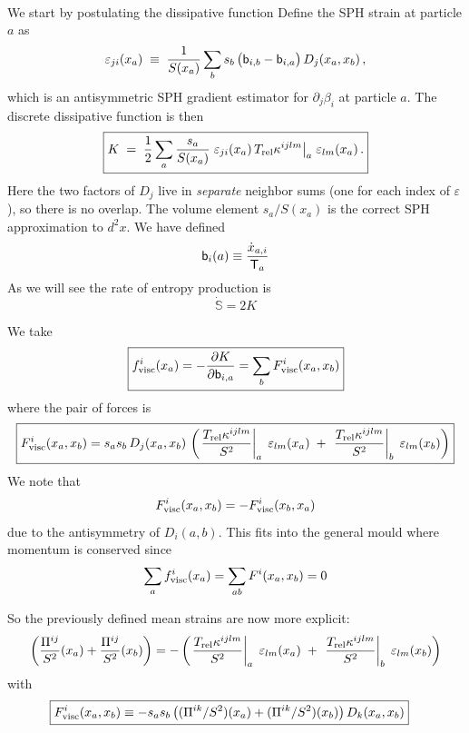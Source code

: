 \documentclass[12pt,aps,preprint,nofootinbib,noshowkeys,noshowpacs,longbibliography,superscriptaddress,tightenlines]{revtex4-2}
\def\Sbb{{\mathbb S}}
\def\bbeta{{\sf b}}
\def\Teff{{\sf T}}
\def\st{\begin{equation}}
\def\stp{\end{equation}}
\begin{document}
 
 \\

We start by postulating the dissipative function
Define the SPH strain at particle $a$ as
\begin{equation}
\label{eq:strain}
    \varepsilon_{ji}(x_a) \;\equiv\;
    \frac{1}{S(x_a)}\sum_b s_b\,
    \bigl(\bbeta_{i,b} - \bbeta_{i,a}\bigr)\,D_j(x_a,x_b) \,,
\end{equation}
which is an antisymmetric SPH gradient estimator for $\partial_j\beta_i$ at
particle $a$.  The discrete dissipative function is then
\begin{equation}
\boxed{
\label{eq:K_twolevel}
    K \;=\; \frac{1}{2} \sum_a \frac{s_a}{S(x_a)}\;
    \varepsilon_{ji}(x_a)\,
    T_{\rm rel}\kappa^{ijlm}\big|_a\;
    \varepsilon_{lm}(x_a) \,.
}
\end{equation}
Here the two factors of $D_j$ live in \emph{separate} neighbor sums (one for
each index of $\varepsilon$), so there is no overlap.  The volume element
$s_a/S(x_a)$ is the correct SPH approximation to $d^2x$.
We have defined
\st
\bbeta_i(a) \equiv \frac{\dot x_{a, i} }{\Teff_a}
\stp
As we will see the rate of entropy production is 
\st
 \dot \Sbb = 2 K 
\stp

We take 
\st
\boxed{
f_{\rm visc}^i(x_a)  = -\frac{\partial K}{\partial \bbeta_{i, a }  } = \sum_b F^i_{\rm visc}(x_a, x_b) }
\stp
where the pair of forces is
\st
\boxed{
      F^i_{\rm visc}(x_a, x_b) = s_a s_b \,D_j(x_a, x_b)\,
     \left( \left. \frac{T_{\rm rel}\kappa^{ijlm}}{S^2}\right|_a\;\varepsilon_{lm}(x_a)
    \;+\;
    \left. \frac{T_{\rm rel}\kappa^{ijlm}}{S^2}\right|_b\;\varepsilon_{lm}(x_b) \right)
}
\stp
We note that
\st
 F^i_{\rm visc}(x_a, x_b) = - F^i_{\rm visc}(x_b, x_a)
\stp
due to the antisymmetry of $D_i(a,b)$. 
This fits into the general mould where momentum is conserved since
\st
\sum_{a} f_{\rm visc}^i(x_a) =\sum_{ab} F^i(x_a, x_b)= 0 
\stp

So the previously defined mean strains are now more explicit:
\st
   \left(\frac{\Pi^{ij}}{S^2}(x_a)  
   +
   \frac{\Pi^{ij}}{S^2}(x_b)  
   \right)
     =
     -\left( \left. \frac{T_{\rm rel}\kappa^{ijlm}}{S^2}\right|_a\;\varepsilon_{lm}(x_a)
    \;+\;
    \left. \frac{T_{\rm rel}\kappa^{ijlm}}{S^2}\right|_b\;\varepsilon_{lm}(x_b) \right)
\stp
with 
\begin{align}
    \Aboxed{
    F_{\rm visc}^i(x_a, x_b) \equiv& - s_a s_b \left( (\Pi^{ik}/S^2)(x_a) + (\Pi^{ik}/S^2)(x_b) \right)  D_k (x_a, x_b)
} 
\end{align}
\end{document}
